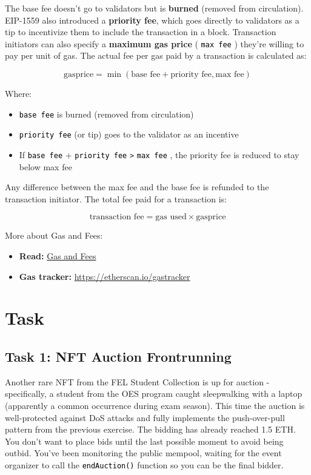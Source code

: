 \documentclass[12pt]{article}
\newcommand{\codegrey}[1]{%
  \texttt{\colorbox{black!4}{\textcolor{black}{#1}}}%
}
\begin{document}
\noindent
The base fee doesn't go to validators but is \textbf{burned} (removed from circulation). EIP-1559 also introduced a \textbf{priority fee}, which goes directly to validators as a tip to incentivize them to include the transaction in a block. Transaction initiators can also specify a \textbf{maximum gas price} (\codegrey{max fee}) they're willing to pay per unit of gas. The actual fee per gas paid by a transaction is calculated as:

\begin{equation}
\text{gasprice} = \min(\text{base fee} + \text{priority fee}, \text{max fee})
\end{equation}

Where:
\begin{itemize}
    \item \codegrey{base fee} is burned (removed from circulation)
    \item \codegrey{priority fee} (or tip) goes to the validator as an incentive
    \item If \codegrey{base fee} + \codegrey{priority fee} \verb|>| \codegrey{max fee}, the priority fee is reduced to stay below max fee
\end{itemize}

\noindent
Any difference between the max fee and the base fee is refunded to the transaction initiator. The total fee paid for a transaction is:

\begin{equation}
\text{transaction fee} = \text{gas used} \times \text{gasprice}
\end{equation}

\medskip
\noindent
More about Gas and Fees:
\begin{itemize}
  \item \textbf{Read:} \href{https://ethereum.org/en/developers/docs/gas/}{Gas and Fees}
  \item \textbf{Gas tracker:} \href{https://etherscan.io/gastracker}{https://etherscan.io/gastracker}
\end{itemize}

\pagebreak
\section{Task}

\subsection*{Task 1: NFT Auction Frontrunning}
Another rare NFT from the FEL Student Collection is up for auction - specifically, a student from the OES program caught sleepwalking with a laptop (apparently a common occurrence during exam season). This time the auction is well-protected against DoS attacks and fully implements the push-over-pull pattern from the previous exercise. The bidding has already reached 1.5 ETH. You don't want to place bids until the last possible moment to avoid being outbid. You've been monitoring the public mempool, waiting for the event organizer to call the \codegrey{endAuction()} function so you can be the final bidder. 
\end{document}
